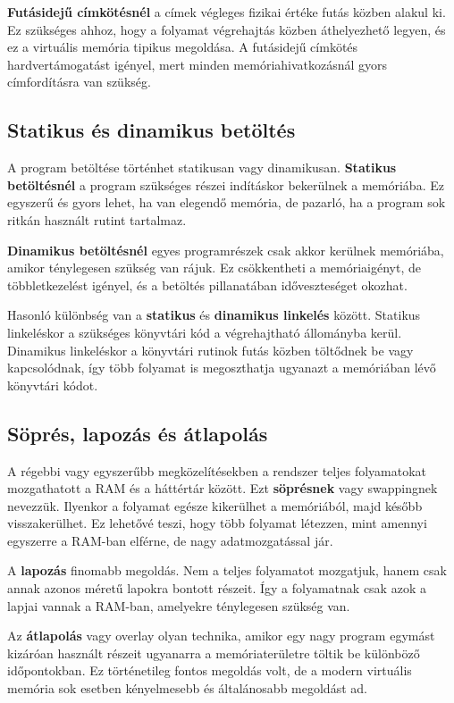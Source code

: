 \textbf{Futásidejű címkötésnél} a címek végleges fizikai értéke futás közben alakul ki. Ez szükséges ahhoz, hogy a folyamat végrehajtás közben áthelyezhető legyen, és ez a virtuális memória tipikus megoldása. A futásidejű címkötés hardvertámogatást igényel, mert minden memóriahivatkozásnál gyors címfordításra van szükség.

\subsection{Statikus és dinamikus betöltés}

A program betöltése történhet statikusan vagy dinamikusan. \textbf{Statikus betöltésnél} a program szükséges részei indításkor bekerülnek a memóriába. Ez egyszerű és gyors lehet, ha van elegendő memória, de pazarló, ha a program sok ritkán használt rutint tartalmaz.

\textbf{Dinamikus betöltésnél} egyes programrészek csak akkor kerülnek memóriába, amikor ténylegesen szükség van rájuk. Ez csökkentheti a memóriaigényt, de többletkezelést igényel, és a betöltés pillanatában időveszteséget okozhat.

Hasonló különbség van a \textbf{statikus} és \textbf{dinamikus linkelés} között. Statikus linkeléskor a szükséges könyvtári kód a végrehajtható állományba kerül. Dinamikus linkeléskor a könyvtári rutinok futás közben töltődnek be vagy kapcsolódnak, így több folyamat is megoszthatja ugyanazt a memóriában lévő könyvtári kódot.

\subsection{Söprés, lapozás és átlapolás}

A régebbi vagy egyszerűbb megközelítésekben a rendszer teljes folyamatokat mozgathatott a RAM és a háttértár között. Ezt \textbf{söprésnek} vagy swappingnek nevezzük. Ilyenkor a folyamat egésze kikerülhet a memóriából, majd később visszakerülhet. Ez lehetővé teszi, hogy több folyamat létezzen, mint amennyi egyszerre a RAM-ban elférne, de nagy adatmozgatással jár.

A \textbf{lapozás} finomabb megoldás. Nem a teljes folyamatot mozgatjuk, hanem csak annak azonos méretű lapokra bontott részeit. Így a folyamatnak csak azok a lapjai vannak a RAM-ban, amelyekre ténylegesen szükség van.

Az \textbf{átlapolás} vagy overlay olyan technika, amikor egy nagy program egymást kizáróan használt részeit ugyanarra a memóriaterületre töltik be különböző időpontokban. Ez történetileg fontos megoldás volt, de a modern virtuális memória sok esetben kényelmesebb és általánosabb megoldást ad.

